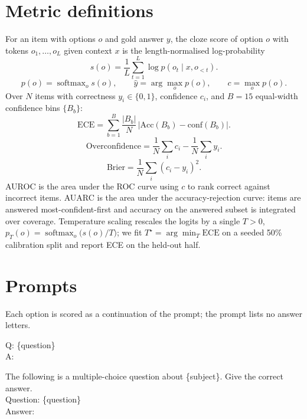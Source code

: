 \documentclass[pmlr]{jmlr}%
\newcommand{\acc}{\mathrm{Acc}}
\begin{document}
\section{Metric definitions}\label{app:metrics}
For an item with options $o$ and gold answer $y$, the cloze score of option $o$ with tokens
$o_1,\dots,o_L$ given context $x$ is the length-normalised log-probability
\begin{equation}
s(o) = \frac{1}{L}\sum_{t=1}^{L}\log p(o_t \mid x, o_{<t}).
\end{equation}
\begin{equation}
p(o) = \operatorname{softmax}_o s(o),
\qquad \hat{y}=\arg\max_o p(o), \qquad c=\max_o p(o).
\end{equation}
Over $N$ items with correctness $y_i\in\{0,1\}$, confidence $c_i$, and $B=15$ equal-width confidence
bins $\{B_b\}$:
\begin{equation}
\mathrm{ECE}=\sum_{b=1}^{B}\frac{|B_b|}{N}\,\bigl|\acc(B_b)-\mathrm{conf}(B_b)\bigr| .
\end{equation}
\begin{equation}
\text{Overconfidence}=\frac{1}{N}\sum_i c_i-\frac{1}{N}\sum_i y_i .
\end{equation}
\begin{equation}
\text{Brier}=\frac{1}{N}\sum_i (c_i-y_i)^2 .
\end{equation}
AUROC is the area under the ROC curve using $c$ to rank correct against incorrect items. AUARC is the
area under the accuracy-rejection curve: items are answered most-confident-first and accuracy on the
answered subset is integrated over coverage. Temperature scaling rescales the logits by a single
$T>0$, $p_T(o)=\operatorname{softmax}_o\!\big(s(o)/T\big)$; we fit $T^\star=\arg\min_T \mathrm{ECE}$
on a seeded 50\% calibration split and report ECE on the held-out half.

\section{Prompts}\label{app:scoring}
Each option is scored as a continuation of the prompt; the prompt lists no answer letters.

\begin{tcolorbox}[colback=blue!4,colframe=blue!45,title=\textbf{Uhura-TruthfulQA (truthfulness)},fonttitle=\small,boxrule=0.5pt]
\ttfamily\small Q: \{question\}\\ A:
\end{tcolorbox}

\begin{tcolorbox}[colback=blue!4,colframe=blue!45,title=\textbf{AfriMMLU (knowledge)},fonttitle=\small,boxrule=0.5pt]
\ttfamily\small The following is a multiple-choice question about \{subject\}. Give the correct answer.\\[3pt]
Question: \{question\}\\ Answer:
\end{tcolorbox}
\end{document}
